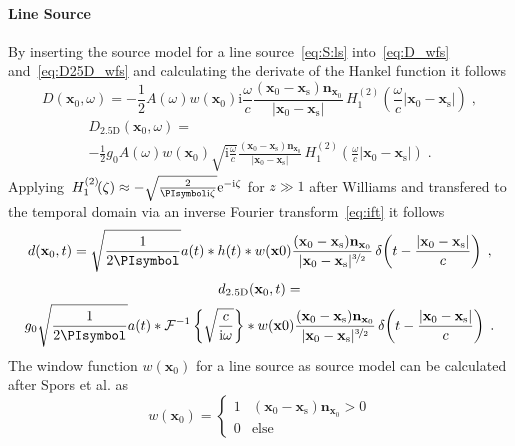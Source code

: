 \documentclass[a4paper]{book}
\newcommand{\reproduce}[1]{%
    \href{#1}{\color{link}\large\Pointinghand}%
}%
\newcommand{\ft}{\footnotesize}                                   %
\newcommand{\PI}{\PIsymbol}%
\newcommand{\I}{\mathrm{i}}                          %
\newcommand{\E}{\mathrm{e}}                          %
\renewcommand{\vec}[1]{\mathbf{#1}}                  %
\newcommand{\x}{\vec{x}}                             %
\newcommand{\xs}{\x_\text{s}}                        %
\newcommand{\xref}{\x_\text{ref}}                    %
\newcommand{\n}{\vec{n}}                             %
\newcommand{\omegac}{\frac{\omega}{c}}               %
\renewcommand{\H}[2]{\,H_{#1}^{(#2)}\!}              %
\newcommand{\deltafunc}[1]{\,\delta\!\left(#1\right)}%
\newcommand{\IFT}[1]{%
    \mathcal{F}^{-1}\left\{#1\right\}}%
\newcommand{\qc}{\;,}                                             %
\newcommand{\qp}{\;.}                                             %
\def \twohalfD {{2.5\text{D}}\xspace}                             %
\newcommand\eqlabel[2][]{%
  \label{eq:#2}%
}
\begin{document}
\paragraph{Line Source}
%
By inserting the source model for a line source~\eqref{eq:S:ls}
into~\eqref{eq:D_wfs} and~\eqref{eq:D25D_wfs} and calculating the derivate of
the Hankel function\cite[][(9.1.30)]{Abramowitz1972} it follows
%
\begin{equation}
    D(\x_0,\omega) = -\frac{1}{2}A(\omega) w(\x_0) \I\omegac
    \frac{(\x_0-\xs)\n_{\x_0}}{|\x_0-\xs|}
    \H{1}{2}\left(\omegac|\x_0-\xs|\right) \qc
    \eqlabel{D:wfs:ls}
\end{equation}
%
\begin{multline}
    D_\twohalfD(\x_0,\omega) = \\
    -\frac{1}{2}g_0 A(\omega) w(\x_0) \sqrt{\I\omegac}
    \frac{(\x_0-\xs)\n_{\x_0}}{|\x_0-\xs|}
    \H{1}{2}\left(\omegac|\x_0-\xs|\right) \qp
    \eqlabel{D:wfs:ls:2.5D}
\end{multline}
%
%    
%
Applying $\H{1}{2}(\zeta) \approx -\sqrt{\frac{2}{\PI \I\zeta}} \E^{-\I\zeta}$ for $z\gg1$ after
Williams\cite[][(4.23)]{Williams1999} and transfered to the
temporal domain via an inverse Fourier
transform~\eqref{eq:ift} it follows
%
\begin{equation}
    d(\x_0,t) = \sqrt{\frac{1}{2\PI}} a(t) * h(t) *
    w(\x0) \frac{(\x_0-\xs)\n_{\x_0}}{|\x_0-\xs|^{\nicefrac{3}{2}}}
    \deltafunc{t-\frac{|\x_0-\xs|}{c}} \qc
    \eqlabel{d:wfs:ls}
\end{equation}
%
\begin{multline}
    d_\twohalfD(\x_0,t) = \\
    g_0 \sqrt{\frac{1}{2\PI}} a(t) *
    \IFT{\sqrt{\frac{c}{\I\omega}}} * w(\x0)
    \frac{(\x_0-\xs)\n_{\x_0}}{|\x_0-\xs|^{\nicefrac{3}{2}}}
    \deltafunc{t-\frac{|\x_0-\xs|}{c}} \qp
    \label{eq:d:wfs:ls_25D}
\end{multline}
%
The window function $w(\x_0)$ for a line source as source model can be
calculated after Spors et al. as\cite{Spors2008}
%
\begin{equation}
    w(\x_0) = 
    \begin{cases}
        1 & (\x_0-\xs) \n_{\x_0} > 0 \\
        0 & \text{else}
    \end{cases}
    \eqlabel{wfs:ls:selection}
\end{equation}
%
\end{document}
